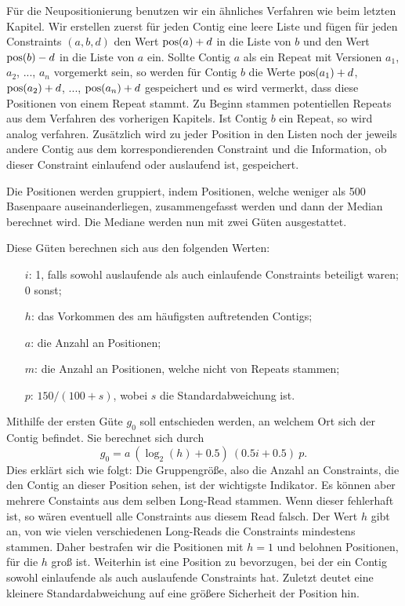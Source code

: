 Für die Neupositionierung benutzen wir ein ähnliches Verfahren wie beim letzten Kapitel. Wir erstellen zuerst für jeden Contig eine leere Liste
und fügen für jeden Constraints $(a,b,d)$ den Wert $\operatorname*{pos}(a)+d$ in die Liste von $b$ und den Wert $\operatorname*{pos}(b)-d$ in die Liste von $a$ ein. Sollte Contig $a$ als ein Repeat mit Versionen $a_1$, $a_2$, ..., $a_n$ vorgemerkt sein, so werden für Contig $b$ die Werte $\operatorname*{pos}(a_1)+d$, $\operatorname*{pos}(a_2)+d$, ..., $\operatorname*{pos}(a_n)+d$ gespeichert und es wird vermerkt, dass diese Positionen von einem Repeat stammt. 
Zu Beginn stammen potentiellen Repeats aus dem Verfahren des vorherigen Kapitels. 
Ist Contig $b$ ein Repeat, so wird analog verfahren.
Zusätzlich wird zu jeder Position in den Listen noch der jeweils andere Contig aus dem korrespondierenden Constraint und die Information, ob dieser Constraint einlaufend oder auslaufend ist, gespeichert.

Die Positionen werden gruppiert, indem Positionen, welche weniger als 500 Basenpaare auseinanderliegen, zusammengefasst werden und dann der Median berechnet wird. Die Mediane werden nun mit zwei Güten ausgestattet. 

Diese Güten berechnen sich aus den folgenden Werten:
\begin{itemize}
	\item[$i$:] 1, falls sowohl auslaufende als auch einlaufende Constraints beteiligt waren; \\ 0 sonst;
	\item[$h$:] das Vorkommen des am häufigsten auftretenden Contigs;
	\item[$a$:] die Anzahl an Positionen;
	\item[$m$:] die Anzahl an Positionen, welche nicht von Repeats stammen;
	\item[$p$:] $150 / (100+s)$, wobei $s$ die Standardabweichung ist.
\end{itemize}

Mithilfe der ersten Güte $g_0$ soll entschieden werden, an welchem Ort sich der Contig befindet. Sie berechnet sich durch 
\[  g_0 = a\ (\log_2(h) + 0.5) \ (0.5i + 0.5)\  p . \]
Dies erklärt sich wie folgt: Die Gruppengröße, also die Anzahl an Constraints, die den Contig an dieser Position sehen, ist der wichtigste Indikator. 
Es können aber mehrere Constaints aus dem selben Long-Read stammen. Wenn dieser fehlerhaft ist, so wären eventuell alle Constraints aus diesem Read falsch. Der Wert $h$ gibt an, von wie vielen verschiedenen Long-Reads die Constraints mindestens stammen. Daher bestrafen wir die Positionen mit $h=1$ und belohnen Positionen, für die $h$ groß ist. 
Weiterhin ist eine Position zu bevorzugen, bei der ein Contig sowohl einlaufende als auch auslaufende Constraints hat. Zuletzt deutet eine kleinere Standardabweichung auf eine größere Sicherheit der Position hin. 


